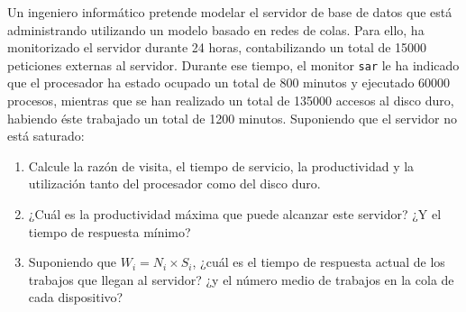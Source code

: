 \begin{ejercicio}\label{ej:5.28}
    Un ingeniero informático pretende modelar el servidor de base de datos que está administrando utilizando un modelo basado en redes de colas. Para ello, ha monitorizado el servidor durante 24 horas, contabilizando un total de 15000 peticiones externas al servidor. Durante ese tiempo, el monitor \verb|sar| le ha indicado que el procesador ha estado ocupado un total de 800 minutos y ejecutado 60000 procesos, mientras que se han realizado un total de 135000 accesos al disco duro, habiendo éste trabajado un total de 1200 minutos. Suponiendo que el servidor no está saturado:
    \begin{enumerate}
        \item Calcule la razón de visita, el tiempo de servicio, la productividad y la utilización tanto del procesador como del disco duro.
        \item ¿Cuál es la productividad máxima que puede alcanzar este servidor? ¿Y el tiempo de respuesta mínimo?
        \item Suponiendo que $W_i = N_i \times S_i$, ¿cuál es el tiempo de respuesta actual de los trabajos que llegan al servidor? ¿y el número medio de trabajos en la cola de cada dispositivo?
    \end{enumerate}
\end{ejercicio}
\begin{comment}
\solucion
    \begin{enumerate}
        \item $V_{cpu} = 4$; $V_{disco} = 9$; $S_{cpu} = 0.8$ s; $S_{disco} = 0.53$ s; $X_{cpu} = 0.69$ trabajos/s; $X_{disco} = 1.56$ trabajos/s; $U_{cpu} = 0.56$; $U_{disco} = 0.83$.
        \item $X_0^{\max} = 0.21$ trabajos/s; $R_0^{\min} = 8.0$ s.
        \item $R_0 = 36$ s; $Q_{cpu} = 0.69$ trabajos; $Q_{disco} = 4.17$ trabajos.
    \end{enumerate}
\end{comment}

